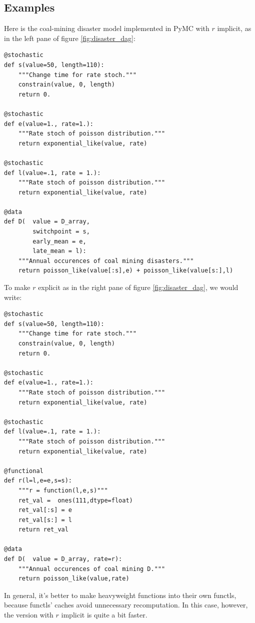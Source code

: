 \documentclass[]{book}
\begin{document}
\subsection{Examples}\label{sub:example}
Here is the coal-mining disaster model implemented in PyMC with $r$ implicit, as in the left pane of figure \ref{fig:disaster_dag}:
\begin{verbatim}
@stochastic
def s(value=50, length=110):
    """Change time for rate stoch."""
    constrain(value, 0, length)
    return 0.

@stochastic
def e(value=1., rate=1.):
    """Rate stoch of poisson distribution."""
    return exponential_like(value, rate)

@stochastic
def l(value=.1, rate = 1.):
    """Rate stoch of poisson distribution."""
    return exponential_like(value, rate)

@data
def D(  value = D_array,
        switchpoint = s,
        early_mean = e,
        late_mean = l):
    """Annual occurences of coal mining disasters."""
    return poisson_like(value[:s],e) + poisson_like(value[s:],l)
\end{verbatim}
To make $r$ explicit as in the right pane of figure \ref{fig:disaster_dag}, we would write:
\begin{verbatim}
@stochastic
def s(value=50, length=110):
    """Change time for rate stoch."""
    constrain(value, 0, length)
    return 0.

@stochastic
def e(value=1., rate=1.):
    """Rate stoch of poisson distribution."""
    return exponential_like(value, rate)

@stochastic
def l(value=.1, rate = 1.):
    """Rate stoch of poisson distribution."""
    return exponential_like(value, rate)

@functional
def r(l=l,e=e,s=s):
    """r = function(l,e,s)"""
    ret_val =  ones(111,dtype=float)
    ret_val[:s] = e
    ret_val[s:] = l
    return ret_val

@data
def D(  value = D_array, rate=r):
    """Annual occurences of coal mining D."""
    return poisson_like(value,rate)
\end{verbatim}
In general, it's better to make heavyweight functions into their own functls, because functls' caches avoid unnecessary recomputation. In this case, however, the version with $r$ implicit is quite a bit faster.
\end{document}
